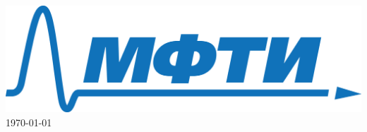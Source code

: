 \begin{titlepage}
		
		\begin{bottompar}
			\includegraphics[width = 80 mm]{logo.png}	\\[1,0cm]
			{\large \today}
		\end{bottompar}
		\vfill %
		
	\end{titlepage}

